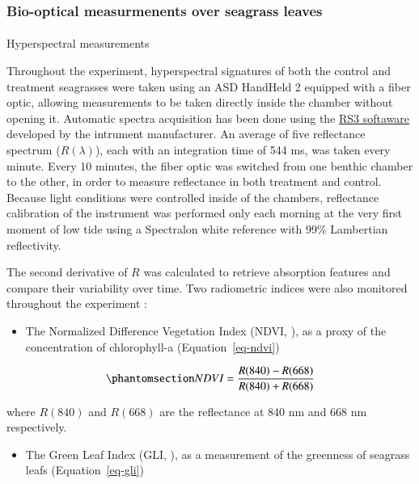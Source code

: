 \documentclass[
  number]{elsarticle}
\makeatletter
\let\oldparagraph\paragraph
\renewcommand{\paragraph}{
    \@ifstar
      \xxxParagraphStar
      \xxxParagraphNoStar
  }
\newcommand{\xxxParagraphStar}[1]{\oldparagraph*{#1}\mbox{}}
\newcommand{\xxxParagraphNoStar}[1]{\oldparagraph{#1}\mbox{}}
\providecommand{\tightlist}{%
  \setlength{\itemsep}{0pt}\setlength{\parskip}{0pt}}\usepackage{longtable,booktabs,array}
\makeatother
\begin{document}
\subsubsection{Bio-optical measurmenents over seagrass
leaves}\label{bio-optical-measurmenents-over-seagrass-leaves}

\paragraph{Hyperspectral measurements}\label{hyperspectral-measurements}

Throughout the experiment, hyperspectral signatures of both the control
and treatment seagrasses were taken using an ASD HandHeld 2 equipped
with a fiber optic, allowing measurements to be taken directly inside
the chamber without opening it. Automatic spectra acquisition has been
done using the
\href{https://www.malvernpanalytical.com/en/learn/knowledge-center/user-manuals/rs3-software-user-manual}{RS3
softaware} developed by the intrument manufacturer. An average of five
reflectance spectrum (\(R(\lambda)\)), each with an integration time of
544 ms, was taken every minute. Every 10 minutes, the fiber optic was
switched from one benthic chamber to the other, in order to measure
reflectance in both treatment and control. Because light conditions were
controlled inside of the chambers, reflectance calibration of the
instrument was performed only each morning at the very first moment of
low tide using a Spectralon white reference with 99\% Lambertian
reflectivity.

The second derivative of \(R\) was calculated to retrieve absorption
features and compare their variability over time. Two radiometric
indices were also monitored throughout the experiment :

\begin{itemize}
\tightlist
\item
  The Normalized Difference Vegetation Index (NDVI,
  \citep{rouse1974monitoring}), as a proxy of the concentration of
  chlorophyll-a (Equation~\ref{eq-ndvi})
\end{itemize}

\begin{equation}\phantomsection\label{eq-ndvi}{
NDVI = \frac{R(840)-R(668)}{R(840)+R(668)}
}\end{equation}

where \(R(840)\) and \(R(668)\) are the reflectance at 840 nm and 668 nm
respectively.

\begin{itemize}
\tightlist
\item
  The Green Leaf Index (GLI, \citep{louhaichi2001spatially}), as a
  measurement of the greenness of seagrass leafs (Equation~\ref{eq-gli})
\end{itemize}
\end{document}
